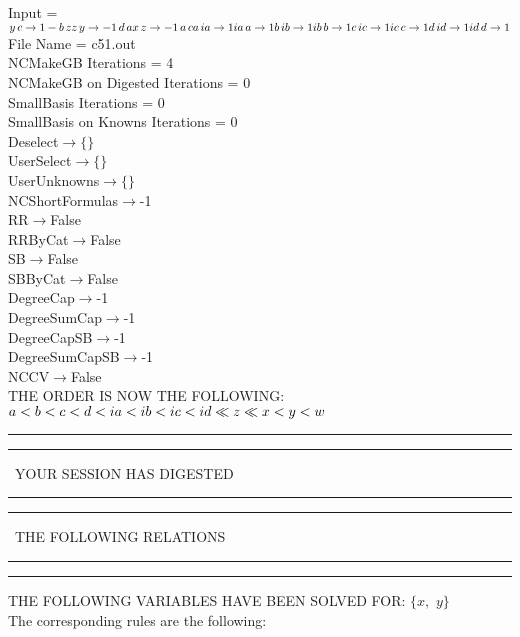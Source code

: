 \documentclass[rep10,leqno]{report}
\begin{document}
\normalsize
\baselineskip=12pt
\noindent
Input = 
$
\\y\,
 c\rightarrow 1 - b\,
 z\\
z\,
 y\rightarrow -1\,
 d\,
 a\\
x\,
 z\rightarrow -1\,
 a\,
 c\\
a\,
 ia\rightarrow 1\\
ia\,
 a\rightarrow 1\\
b\,
 ib\rightarrow 1\\
ib\,
 b\rightarrow 1\\
c\,
 ic\rightarrow 1\\
ic\,
 c\rightarrow 1\\
d\,
 id\rightarrow 1\\
id\,
 d\rightarrow 1\\
$
File Name = c51.out\\
NCMakeGB Iterations = 4\\
NCMakeGB on Digested Iterations = 0\\
SmallBasis Iterations = 0\\
SmallBasis on Knowns Iterations = 0\\
Deselect$\rightarrow \{\}$\\
UserSelect$\rightarrow \{\}$\\
UserUnknowns$\rightarrow \{\}$\\
NCShortFormulas$\rightarrow$-1\\
RR$\rightarrow $False\\
RRByCat$\rightarrow $False\\
SB$\rightarrow $False\\
SBByCat$\rightarrow $False\\
DegreeCap$\rightarrow $-1\\
DegreeSumCap$\rightarrow $-1\\
DegreeCapSB$\rightarrow $-1\\
DegreeSumCapSB$\rightarrow $-1\\
NCCV$\rightarrow $False\\
THE ORDER IS NOW THE FOLLOWING:\hfil\break
$
a<b<c<d<ia<ib<ic<id\ll
z\ll
x<y<w\\
$
\rule[2pt]{6in}{4pt}\hfil\break
\rule[2pt]{1.879in}{4pt}
\ YOUR SESSION HAS DIGESTED\ 
\rule[2pt]{1.879in}{4pt}\hfil\break
\rule[2pt]{1.923in}{4pt}
\ THE FOLLOWING RELATIONS\ 
\rule[2pt]{1.923in}{4pt}\hfil\break
\rule[2pt]{6in}{4pt}\hfil\break
THE FOLLOWING VARIABLES HAVE BEEN SOLVED FOR:\hfil\break
$\{x,
$ $
y\}$
\smallskip\\
The corresponding rules are the following:\smallskip\\
\end{document}
